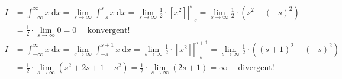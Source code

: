 \documentclass[10pt]{article}
\begin{document}
\begin{align*}
I & =\int_{-\infty}^{\infty} x \mathrm{~d} x=\lim _{s \rightarrow \infty} \int_{-s}^{s} x \mathrm{~d} x=\left.\lim _{s \rightarrow \infty} \frac{1}{2} \cdot\left[x^{2}\right]\right|_{-s} ^{s}=\lim _{s \rightarrow \infty} \frac{1}{2} \cdot\left(s^{2}-(-s)^{2}\right) \\
& =\frac{1}{2} \cdot \lim _{s \rightarrow \infty} 0=0 \quad \text { konvergent! }  \tag{3.38}\\
I & =\int_{-\infty}^{\infty} x \mathrm{~d} x=\lim _{s \rightarrow \infty} \int_{-s}^{s+1} x \mathrm{~d} x=\left.\lim _{s \rightarrow \infty} \frac{1}{2} \cdot\left[x^{2}\right]\right|_{-s} ^{s+1}=\lim _{s \rightarrow \infty} \frac{1}{2} \cdot\left((s+1)^{2}-(-s)^{2}\right) \\
& =\frac{1}{2} \cdot \lim _{s \rightarrow \infty}\left(s^{2}+2 s+1-s^{2}\right)=\frac{1}{2} \cdot \lim _{s \rightarrow \infty}(2 s+1)=\infty \quad \text { divergent! } \tag{3.39}
\end{align*}
\end{document}
